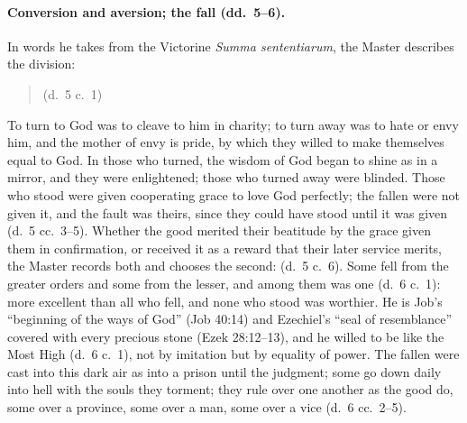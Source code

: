 \paragraph{Conversion and aversion; the fall (dd.~5--6).} In words he takes
from the Victorine \emph{Summa sententiarum}, the Master describes the
division:

\begin{quote}
 (d.~5 c.~1)
\end{quote}

\noindent To turn to God was to cleave to him in charity; to turn away was to
hate or envy him, and the mother of envy is pride, by which they willed to
make themselves equal to God. In those who turned, the wisdom of God began to
shine as in a mirror, and they were enlightened; those who turned away were
blinded. Those who stood were given cooperating grace to love God perfectly;
the fallen were not given it, and the fault was theirs, since they could
have stood until it was given (d.~5 cc.~3--5). Whether the good merited
their beatitude by the grace given them in confirmation, or received it as
a reward that their later service merits, the Master records both and
chooses the second:  (d.~5 c.~6).
Some fell from the greater orders and some from the lesser, and among them
was one  (d.~6 c.~1): more excellent than all who fell, and
none who stood was worthier. He is Job's ``beginning of the ways of God''
(Job 40:14) and Ezechiel's ``seal of resemblance'' covered with every
precious stone (Ezek 28:12--13), and he willed to be like the Most High
 (d.~6 c.~1), not
by imitation but by equality of power. The fallen were cast into this dark
air as into a prison until the judgment; some go down daily into hell with
the souls they torment; they rule over one another as the good do, some
over a province, some over a man, some over a vice (d.~6 cc.~2--5).

